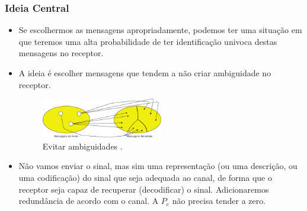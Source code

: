 \begin{frame}[allowframebreaks]
  \frametitle{Ideia Central}
  \begin{itemize}
  \item Se escolhermos as mensagens apropriadamente, podemos ter uma situação em que teremos uma alta probabilidade
	de ter identificação univoca destas mensagens no receptor.
  \item A ideia é escolher mensagens que tendem a não criar ambiguidade no receptor.
                \begin{figure}[h!]
                \centering
                \includegraphics[width=0.5\textwidth]{images/msgsourcereceived.pdf}
		\caption{Evitar ambiguidades \citep{bilmes2013}.}
                \label{fig:msgsourcereceived}
                \end{figure}
  \item Não vamos enviar o sinal, mas sim uma representação (ou uma descrição, ou uma codificação) do sinal
	que seja adequada ao canal, de forma que o receptor seja capaz de recuperar (decodificar) o sinal.
	Adicionaremos redundância de acordo com o canal. A $P_e$ não precisa tender a zero.
  \end{itemize}

\end{frame}




